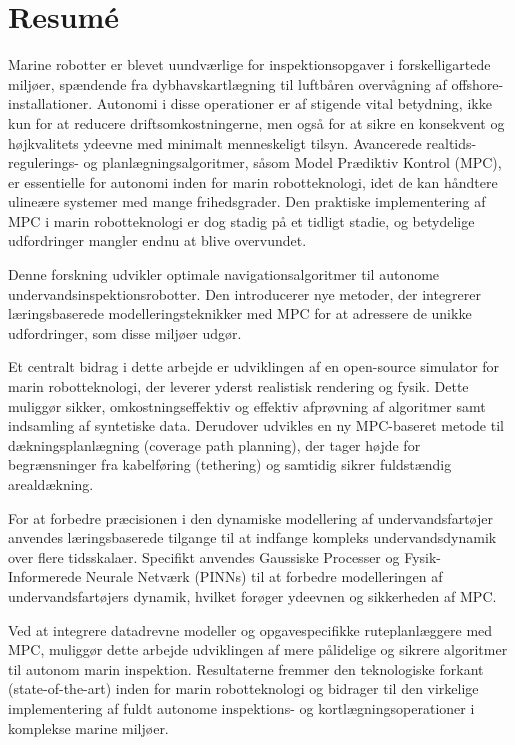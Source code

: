 \chapter*{Resum\'e}
Marine robotter er blevet uundværlige for inspektionsopgaver i forskelligartede miljøer, spændende fra dybhavskartlægning til luftbåren overvågning af offshore-installationer. Autonomi i disse operationer er af stigende vital betydning, ikke kun for at reducere driftsomkostningerne, men også for at sikre en konsekvent og højkvalitets ydeevne med minimalt menneskeligt tilsyn. Avancerede realtids-regulerings- og planlægningsalgoritmer, såsom Model Prædiktiv Kontrol (MPC), er essentielle for autonomi inden for marin robotteknologi, idet de kan håndtere ulineære systemer med mange frihedsgrader. Den praktiske implementering af MPC i marin robotteknologi er dog stadig på et tidligt stadie, og betydelige udfordringer mangler endnu at blive overvundet.

Denne forskning udvikler optimale navigationsalgoritmer til autonome undervandsinspektionsrobotter. Den introducerer nye metoder, der integrerer læringsbaserede modelleringsteknikker med MPC for at adressere de unikke udfordringer, som disse miljøer udgør.

Et centralt bidrag i dette arbejde er udviklingen af en open-source simulator for marin robotteknologi, der leverer yderst realistisk rendering og fysik. Dette muliggør sikker, omkostningseffektiv og effektiv afprøvning af algoritmer samt indsamling af syntetiske data. Derudover udvikles en ny MPC-baseret metode til dækningsplanlægning (coverage path planning), der tager højde for begrænsninger fra kabelføring (tethering) og samtidig sikrer fuldstændig arealdækning.

For at forbedre præcisionen i den dynamiske modellering af undervandsfartøjer anvendes læringsbaserede tilgange til at indfange kompleks undervandsdynamik over flere tidsskalaer. Specifikt anvendes Gaussiske Processer og Fysik-Informerede Neurale Netværk (PINNs) til at forbedre modelleringen af undervandsfartøjers dynamik, hvilket forøger ydeevnen og sikkerheden af MPC.

Ved at integrere datadrevne modeller og opgavespecifikke ruteplanlæggere med MPC, muliggør dette arbejde udviklingen af mere pålidelige og sikrere algoritmer til autonom marin inspektion. Resultaterne fremmer den teknologiske forkant (state-of-the-art) inden for marin robotteknologi og bidrager til den virkelige implementering af fuldt autonome inspektions- og kortlægningsoperationer i komplekse marine miljøer.

